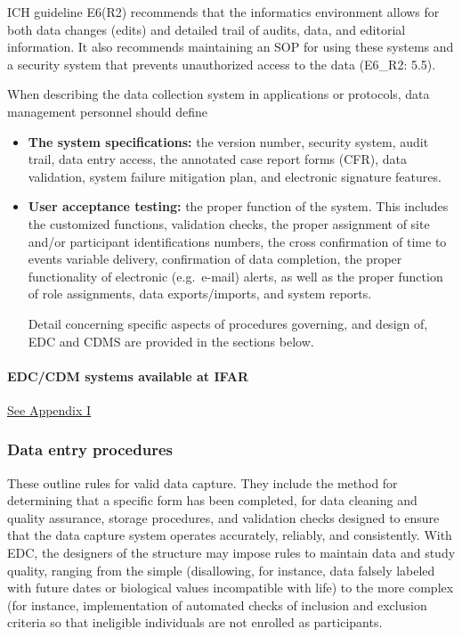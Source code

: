\documentclass[]{book}
\begin{document}
ICH guideline E6(R2) recommends that the informatics environment allows
for both data changes (edits) and detailed trail of audits, data, and
editorial information. It also recommends maintaining an SOP for using
these systems and a security system that prevents unauthorized access to
the data (E6\_R2: 5.5).

When describing the data collection system in applications or protocols,
data management personnel should define

\begin{itemize}
\item
  \textbf{The system specifications:} the version number, security
  system, audit trail, data entry access, the annotated case report
  forms (CFR), data validation, system failure mitigation plan, and
  electronic signature features.
\item
  \textbf{User acceptance testing:} the proper function of the system.
  This includes the customized functions, validation checks, the proper
  assignment of site and/or participant identifications numbers, the
  cross confirmation of time to events variable delivery, confirmation
  of data completion, the proper functionality of electronic
  (e.g.~e-mail) alerts, as well as the proper function of role
  assignments, data exports/imports, and system reports.

  Detail concerning specific aspects of procedures governing, and design
  of, EDC and CDMS are provided in the sections below.
\end{itemize}

\paragraph{EDC/CDM systems available at
IFAR}\label{edccdm-systems-available-at-ifar}

\protect\hyperlink{systems-available-at-ifar}{See Appendix I}

\subsubsection{Data entry procedures}\label{data-entry-procedures}

These outline rules for valid data capture. They include the method for
determining that a specific form has been completed, for data cleaning
and quality assurance, storage procedures, and validation checks
designed to ensure that the data capture system operates accurately,
reliably, and consistently. With EDC, the designers of the structure may
impose rules to maintain data and study quality, ranging from the simple
(disallowing, for instance, data falsely labeled with future dates or
biological values incompatible with life) to the more complex (for
instance, implementation of automated checks of inclusion and exclusion
criteria so that ineligible individuals are not enrolled as
participants.
\end{document}
